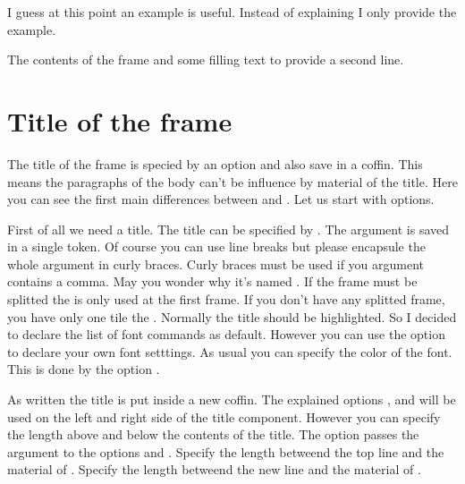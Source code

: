 \documentclass[openany,12pt,tocdepth=3]{ltx-md}
\begin{document}
I guess at this point an example is useful. Instead of explaining I 
only provide the example.

\begin{ltxexample}[caption={Example main part},label=main,result=true]
 \begin{xframed}[%
   line-width=4pt,line-color=blue,
   inner-margin=1cm,font-color=blue!70,
   head={Example of Head},head-font-color={red!70},
   margin=1.5cm,bg-color=yellow!20,
  ]
   The contents of the frame and some filling text to 
  provide a second line.
 \end{xframed}
\end{ltxexample}


\section{Title of the frame}\label{sec:element-firsttitle}
The title of the frame is specied by an option and also save in a coffin. 
This means the paragraphs of the body can't be influence by material
of the title. Here you can see the first main differences between
 and . Let us start with options.

First of all we need a title. The title can be specified by . The argument
is saved in a single token. Of course you can use line breaks but please encapsule
the whole argument in curly braces. Curly braces must be used if you argument contains
a comma. May you wonder why it's named . If the frame
must be splitted the  is only used at the first frame. If
you don't have any splitted frame, you have only one tile the .
Normally the title should be highlighted. So I decided to declare the list of
font commands as default. However you can use the option  to
declare your own font setttings.
As usual you can specify the color of the font. This is done by the option
.

As written the title is put inside a new coffin. The explained options ,
 and  will be used on the left and right side of
the title component. However you can specify the length above and below the contents of the title. 
The option  passes the argument to the options 
and .
Specify the length betweend the top line and the material of .
Specify the length betweend the new line  and the material of .
\end{document}
